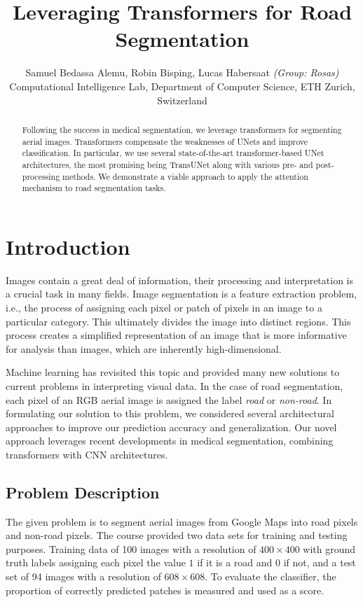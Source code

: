 \documentclass[10pt,conference,compsocconf]{IEEEtran}
\begin{document}
\title{Leveraging Transformers for Road Segmentation}

\author{
  Samuel Bedassa Alemu, Robin Bisping, Lucas Habersaat \textit{(Group: Rosas)}\\
  Computational Intelligence Lab, Department of Computer Science, ETH Zurich, Switzerland
}

\maketitle

\begin{abstract}
Following the success in medical segmentation, we leverage transformers for segmenting aerial images. Transformers compensate the weaknesses of UNets and improve classification. In particular, we use several state-of-the-art transformer-based UNet architectures, the most promising being TransUNet along with various pre- and post-processing methods. We demonstrate a viable approach to apply the attention mechanism to road segmentation tasks.

\end{abstract}

\section{Introduction}

Images contain a great deal of information, their processing and interpretation is a crucial task in many fields. Image segmentation is a feature extraction problem, i.e., the process of assigning each pixel or patch of pixels in an image to a particular category. This ultimately divides the image into distinct regions. This process creates a simplified representation of an image that is more informative for analysis than images, which are inherently high-dimensional.

Machine learning has revisited this topic and provided many new solutions to current problems in interpreting visual data. In the case of road segmentation, each pixel of an RGB aerial image is assigned the label \textit{road} or \textit{non-road}. In formulating our solution to this problem, we considered several architectural approaches to improve our prediction accuracy and generalization. Our novel approach leverages recent developments in medical segmentation, combining transformers with CNN architectures.


\subsection{Problem Description}
The given problem is to segment aerial images from Google Maps into road pixels and non-road pixels. The course provided two data sets for training and testing purposes. Training data of 100 images with a resolution of $400 \times 400$ with ground truth labels assigning each pixel the value $1$ if it is a road and $0$ if not, and a test set of 94 images with a resolution of $608 \times 608$. To evaluate the classifier, the proportion of correctly predicted patches is measured and used as a score.
\end{document}
